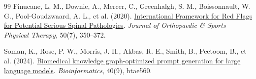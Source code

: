 \begin{thebibliography}{99}
Finucane, L. M., Downie, A., Mercer, C., Greenhalgh, S. M., Boissonnault, W. G., Pool-Goudzwaard, A. L., et al. (2020).
\href{https://doi.org/10.2519/jospt.2020.9971}{International Framework for Red Flags for Potential Serious Spinal Pathologies}.
\textit{Journal of Orthopaedic \& Sports Physical Therapy}, 50(7), 350--372.

Soman, K., Rose, P. W., Morris, J. H., Akbas, R. E., Smith, B., Peetoom, B., et al. (2024).
\href{https://doi.org/10.1093/bioinformatics/btae560}{Biomedical knowledge graph-optimized prompt generation for large language models}.
\textit{Bioinformatics}, 40(9), btae560.

\end{thebibliography}
